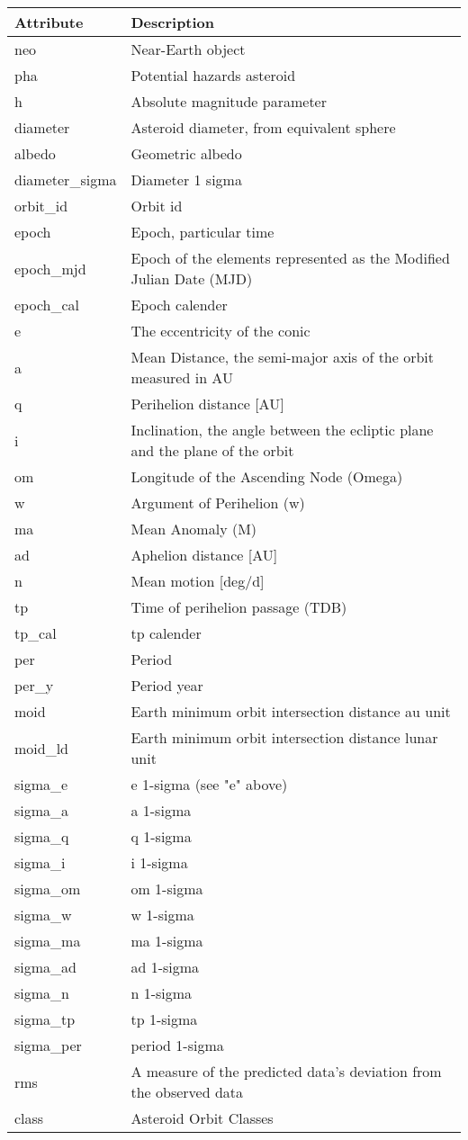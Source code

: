 \begin{tabular}{m{}m{}}\toprule			
\textbf{Attribute}	&	\textbf{Description}	\\
\midrule[0.1pt]\vspace{-10pt}			
neo	&	Near-Earth object	\\
pha	&	Potential hazards asteroid	\\
h	&	Absolute magnitude parameter	\\
diameter	&	Asteroid diameter, from equivalent sphere	\\
albedo	&	Geometric albedo	\\
diameter\_sigma	&	Diameter 1 sigma	\\
orbit\_id	&	Orbit id	\\
epoch	&	Epoch, particular time	\\
epoch\_mjd	&	Epoch of the elements represented as the Modified Julian Date (MJD)	\\
epoch\_cal	&	Epoch calender	\\
e	&	The eccentricity of the conic	\\
a	&	Mean Distance, the semi-major axis of the orbit measured in AU	\\
q	&	Perihelion distance [AU]	\\
i	&	Inclination, the angle between the ecliptic plane and the plane of the orbit	\\
om	&	Longitude of the Ascending Node (Omega)	\\
w	&	Argument of Perihelion (w)	\\
ma	&	Mean Anomaly (M)	\\
ad	&	Aphelion distance [AU]	\\
n	&	Mean motion [deg/d]	\\
tp	&	Time of perihelion passage (TDB)	\\
tp\_cal	&	tp calender	\\
per	&	Period	\\
per\_y	&	Period year	\\
moid	&	Earth minimum orbit intersection distance au unit	\\
moid\_ld	&	Earth minimum orbit intersection distance lunar unit	\\
sigma\_e	&	e 1-sigma (see "e" above)	\\
sigma\_a	&	a 1-sigma	\\
sigma\_q	&	q 1-sigma	\\
sigma\_i	&	i 1-sigma	\\
sigma\_om	&	om 1-sigma	\\
sigma\_w	&	w 1-sigma	\\
sigma\_ma	&	ma 1-sigma	\\
sigma\_ad	&	ad 1-sigma	\\
sigma\_n	&	n 1-sigma	\\
sigma\_tp	&	tp 1-sigma	\\
sigma\_per	&	period 1-sigma	\\
rms	&	A measure of the predicted data’s deviation from the observed data	\\
class	&	Asteroid Orbit Classes	\\
\bottomrule\end{tabular}			